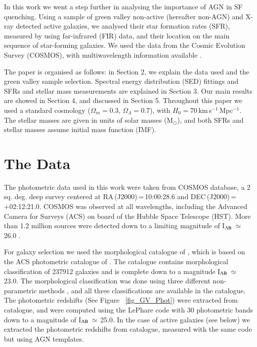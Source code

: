 \documentclass[fleqn,usenatbib]{mnras}
\begin{document}
In this work we went a step further in analysing the importance of AGN in SF quenching. Using a sample of green valley non-active (hereafter non-AGN) and X-ray detected active galaxies, we analysed their star formation rates (SFR), measured by using far-infrared (FIR) data, and their location on the main sequence of star-forming galaxies. We used the data from the Cosmic Evolution Survey (COSMOS), with multiwavelength information available \citep{scoville07}. 

The paper is organised as follows: in Section 2, we explain the data used and the green valley sample selection. Spectral energy distribution (SED) fittings and SFRs and stellar mass measurements are explained in Section 3. Our main results are showed in Section 4, and discussed in Section 5. Throughout this paper we used a standard cosmology ($\Omega_{m}=0.3,\,\Omega_{\Lambda}=0.7$), with $H_{0}=70$\,km\,s$^{-1}$\,Mpc$ ^{-1}$. The stellar masses are given in units of solar masses (M$_{\odot}$), and both SFRs and stellar masses assume \citet{Salpeter1955} initial mass function (IMF).

\section{The Data}\label{Data}
The photometric data used in this work were taken from COSMOS \citep{scoville07} database, a 2 sq. deg. deep survey centered at RA\,(J2000)\,=\,10:00:28.6 and DEC\,(J2000)\,=\,+02:12:21.0. COSMOS was observed at all wavelengths, including the Advanced Camera for Surveys (ACS) on board of the Hubble Space Telescope (HST). More than 1.2 million sources were detected down to a limiting magnitude of I$\rm{_{AB}}$\,$\simeq$\,26.0 \citep{scoville07}.

For galaxy selection we used the morphological catalogue of \citet{Tasca2009}, which is based on the ACS photometric catalogue of \citet{Leauthaud}. The catalogue contains morphological classification of 237912 galaxies and is complete down to a magnitude I$\rm{_{AB}}$\,$\simeq$\,23.0. The morphological classification was done using three different non-parametric methods \citep{Abraham, Huertas, Tasca2009}, and all three classifications are available in the catalogue. The photometric redshifts (See Figure ~\ref{fig_GV_Phot}) were extracted from \citet{Ilbert2009} catalogue, and were computed using the LePhare code \citep{Arnouts2011} with 30 photometric bands down to a magnitude of I$\rm{_{AB}}$\,$\simeq$\,25.0. In the case of active galaxies (see below) we extracted the photometric redshifts from \citet{Salvato} catalogue, measured with the same code but using AGN templates.
\end{document}
